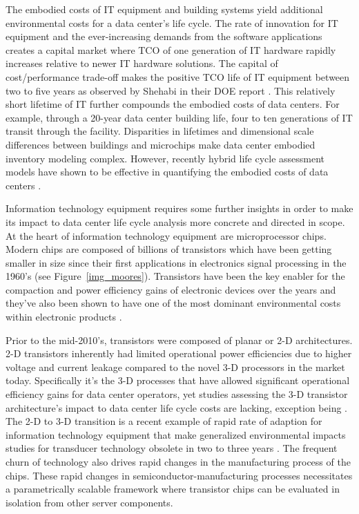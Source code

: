         The embodied costs of IT equipment and building systems yield additional environmental costs for a data center's life cycle. The rate of innovation for IT equipment and the ever-increasing demands from the software applications creates a capital market where TCO of one generation of IT hardware rapidly increases relative to newer IT hardware solutions. The capital of cost/performance trade-off makes the positive TCO life of IT equipment between two to five years as observed by Shehabi in their DOE report \cite{Shehabi16}. This relatively short lifetime of IT further compounds the embodied costs of data centers. For example, through a 20-year data center building life, four to ten generations of IT transit through the facility. Disparities in lifetimes and dimensional scale differences between buildings and microchips make data center embodied inventory modeling complex. However, recently hybrid life cycle assessment models have shown to be effective in quantifying the embodied costs of data centers \cite{shah11, whitehead15}. 

        Information technology equipment requires some further insights in order to make its impact to data center life cycle analysis more concrete and directed in scope. At the heart of information technology equipment are microprocessor chips. Modern chips are composed of billions of transistors which have been getting smaller in size since their first applications in electronics signal processing in the 1960's (see Figure~\ref{img_moores}). Transistors have been the key enabler for the compaction and power efficiency gains of electronic devices over the years and they've also been shown to have one of the most dominant environmental costs within electronic products \cite{boyd09, alcaraz18}.

        Prior to the mid-2010's, transistors were composed of planar or 2-D architectures. 2-D transistors inherently had limited operational power efficiencies due to higher voltage and current leakage compared to the novel 3-D processors in the market today. Specifically it's the 3-D processes that have allowed significant operational efficiency gains for data center operators, yet studies assessing the 3-D transistor architecture's impact to data center life cycle costs are lacking, exception being \cite{kline16}. The 2-D to 3-D transition is a recent example of rapid rate of adaption for information technology equipment that make generalized environmental impacts studies for transducer technology obsolete in two to three years \cite{murphy03}. The frequent churn of technology also drives rapid changes in the manufacturing process of the chips. These rapid changes in semiconductor-manufacturing processes necessitates a parametrically scalable framework where transistor chips can be evaluated in isolation from other server components.  

